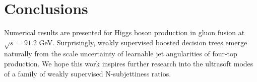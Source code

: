 \section{Conclusions}\label{sec:conclusions}

Numerical results are presented for Higgs boson production in gluon
fusion at $\sqrt{s} = 91.2$ GeV. Surprisingly, weakly supervised boosted
decision trees emerge naturally from the scale uncertainty of learnable
jet angularities of four-top production. We hope this work inspires
further research into the ultrasoft modes of a family of weakly
supervised N-subjettiness ratios.

